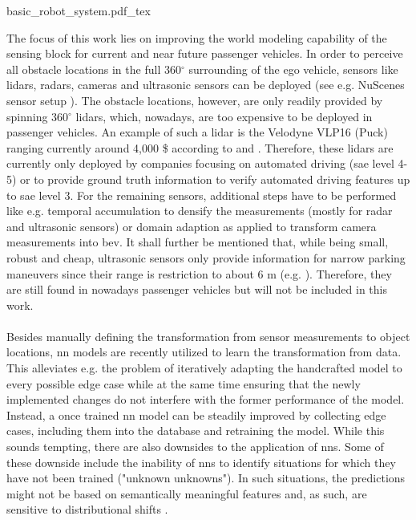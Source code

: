 \begin{center}
	{basic_robot_system.pdf_tex}
\end{center}
The focus of this work lies on improving the world modeling capability of the sensing block for current and near future passenger vehicles. In order to perceive all obstacle locations in the full 360$^{\circ}$ surrounding of the ego vehicle, sensors like lidars, radars, cameras and ultrasonic sensors can be deployed (see e.g. NuScenes sensor setup \cite{caesar2020nuscenes}). The obstacle locations, however, are only readily provided by spinning 360$^{\circ}$ lidars, which, nowadays, are too expensive to be deployed in passenger vehicles. An example of such a lidar is the Velodyne VLP16 (Puck) ranging currently around 4,000 \$ according to \cite{cnet2018} and \cite{velodyne2018}. Therefore, these lidars are currently only deployed by companies focusing on automated driving (\gls{sae} level 4-5) or to provide ground truth information to verify automated driving features up to \gls{sae} level 3. For the remaining sensors, additional steps have to be performed like e.g. temporal accumulation to densify the measurements (mostly for radar and ultrasonic sensors) or domain adaption as applied to transform camera measurements into \gls{bev}. It shall further be mentioned that, while being small, robust and cheap, ultrasonic sensors only provide information for narrow parking maneuvers since their range is restriction to about 6 m (e.g. \cite{boschultrasonic2022}). Therefore, they are still found in nowadays passenger vehicles but will not be included in this work.
\\\\
Besides manually defining the transformation from sensor measurements to object locations, \gls{nn} models are recently utilized to learn the transformation from data. This alleviates e.g. the problem of iteratively adapting the handcrafted model to every possible edge case while at the same time ensuring that the newly implemented changes do not interfere with the former performance of the model. Instead, a once trained \gls{nn} model can be steadily improved by collecting edge cases, including them into the database and retraining the model. While this sounds tempting, there are also downsides to the application of \gls{nn}s. Some of these downside include the inability of \gls{nn}s to identify situations for which they have not been trained ("unknown unknowns"). In such situations, the predictions might not be based on semantically meaningful features and, as such, are sensitive to distributional shifts \cite{safetyfirst2019}.
